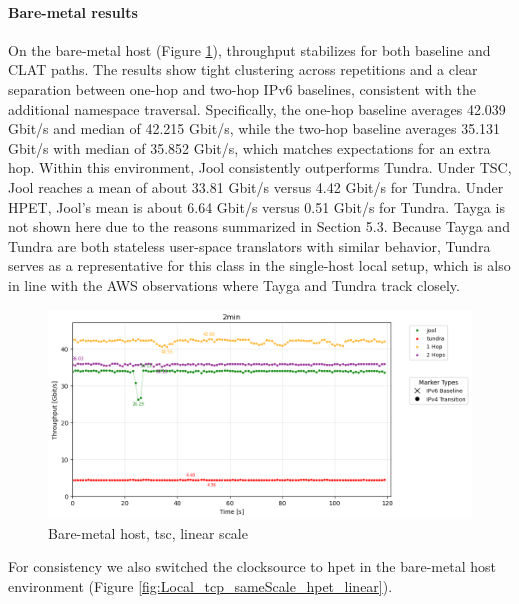 \paragraph{Bare-metal results}

On the bare-metal host (Figure \ref{fig:Local_tcp_sameScale_tsc_linear}), throughput stabilizes for both baseline and CLAT paths. The results show tight clustering across repetitions and a clear separation between one-hop and two-hop IPv6 baselines, consistent with the additional namespace traversal. Specifically, the one-hop baseline averages 42.039 Gbit/s and median of 42.215 Gbit/s, while the two-hop baseline averages 35.131 Gbit/s with median of 35.852 Gbit/s, which matches expectations for an extra hop. Within this environment, Jool consistently outperforms Tundra. Under TSC, Jool reaches a mean of about 33.81 Gbit/s versus 4.42 Gbit/s for Tundra. Under HPET, Jool's mean is about 6.64 Gbit/s versus 0.51 Gbit/s for Tundra. Tayga is not shown here due to the reasons summarized in Section 5.3. Because Tayga and Tundra are both stateless user-space translators with similar behavior, Tundra serves as a representative for this class in the single-host local setup, which is also in line with the AWS observations where Tayga and Tundra track closely.

\begin{figure}[H]
    \centering
    \includegraphics[width=1\textwidth]{resources/finalPlots/combinedplots/SingleLocal_tcp_sameScale_tsc_2min_linear.png}
    \caption{Bare-metal host, tsc, linear scale}
    \label{fig:Local_tcp_sameScale_tsc_linear}
\end{figure}

For consistency we also switched the clocksource to hpet in the bare-metal host environment (Figure \ref{fig:Local_tcp_sameScale_hpet_linear}).

